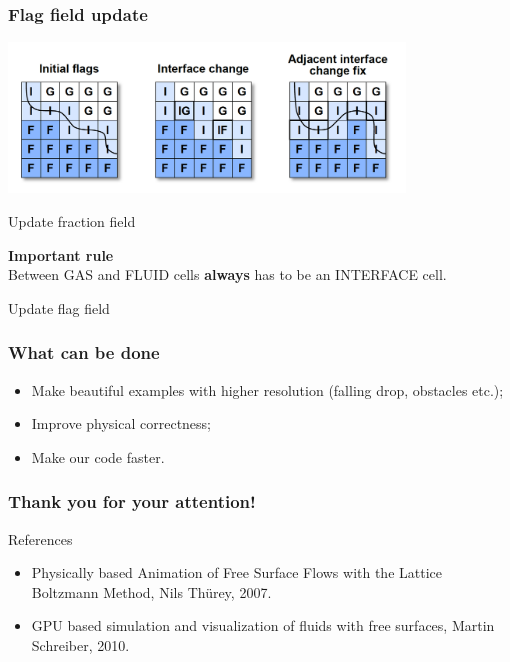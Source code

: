\documentclass[10pt,a4paper]{beamer}
\DeclareRobustCommand{\mybox}[2][gray!20]{%
\begin{tcolorbox}[   %
        breakable,
        left=0pt,
        right=0pt,
        top=0pt,
        bottom=0pt,
        colback=#1,
        colframe=#1,
        width=\dimexpr\textwidth\relax, 
        enlarge left by=0mm,
        boxsep=5pt,
        arc=0pt,outer arc=0pt,
        ]
        #2
\end{tcolorbox}
}
\begin{document}
\begin{frame}
  \frametitle{Flag field update}
  \includegraphics[height=4cm]{interface}

  Update fraction field
  \mybox[green!20]{
    \textbf{Important rule}\\
    Between GAS and FLUID cells \textbf{always} has to be
    an INTERFACE cell.
  }
  Update flag field
\end{frame}
\begin{frame}
  \frametitle{What can be done}
  \begin{itemize}
  \item Make beautiful examples with higher resolution (falling drop, obstacles
    etc.);
    \item Improve physical correctness;
  \item Make our code faster.
  \end{itemize}
\end{frame}

\begin{frame}
\frametitle{Thank you for your attention!}
\end{frame}


\begin{frame}
  References
  \begin{itemize}
  \item Physically based Animation of Free Surface Flows with the Lattice
    Boltzmann Method, Nils Thürey, 2007.
  \item GPU based simulation and visualization of fluids with free surfaces, Martin Schreiber, 2010.
  \end{itemize}
\end{frame}
\end{document}
